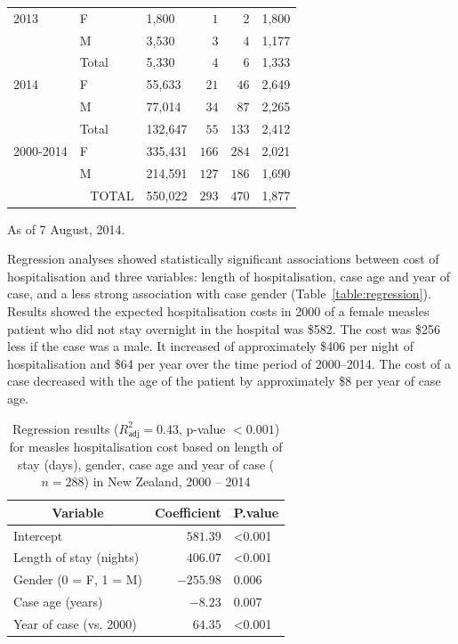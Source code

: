 \documentclass{article}
\begin{document}
\begin{table}
\begin{center}
\begin{tabular}{lllrrl}
2013&F&1,800&$  1$&$  2$&1,800\tabularnewline
&M&3,530&$  3$&$  4$&1,177\tabularnewline
                    &Total&5,330&$  4$&$  6$&1,333\tabularnewline
2014&F&55,633&$ 21$&$ 46$&2,649\tabularnewline
&M&77,014&$ 34$&$ 87$&2,265\tabularnewline
&Total&132,647&$ 55$&$133$&2,412\tabularnewline
2000-2014&      F&335,431&$166$&$284$&2,021\tabularnewline
&     M&214,591&$127$&$186$&1,690\tabularnewline
&   TOTAL&550,022&$293$&$470$&1,877\tabularnewline
\hline
\end{tabular}\end{center}\label{table:cases}
 \centering
 \begin{tablenotes}
      \small
      \item As of 7 August, 2014.
    \end{tablenotes}
\end{table}

Regression analyses showed statistically significant associations between cost of hospitalisation and three variables: length of hospitalisation, case age and year of case, and a less strong association with case gender (Table~\autoref{table:regression}). Results showed the expected hospitalisation costs in 2000 of a female measles patient who did not stay overnight in the hospital was \$582.  The cost was \$256 less if the case was a male. It increased of approximately \$406 per night of hospitalisation and \$64 per year over the time period of 2000--2014. The cost of a case decreased with the age of the patient by approximately \$8 per year of case age.


\begin{table}
\caption{Regression results ($R^{2}_\textsf{adj} = 0.43$, p-value $<0.001$) for measles hospitalisation cost based on length of stay (days), gender, case age and year of case ($n=288$) in New Zealand, 2000 -- 2014}
\begin{center}
\begin{tabular}{lrl}
\hline\hline
\multicolumn{1}{c}{Variable}&\multicolumn{1}{c}{Coefficient}&\multicolumn{1}{c}{P.value}\tabularnewline
\hline
Intercept&$ 581.39$&\textless 0.001\tabularnewline
Length of stay (nights)&$ 406.07$&\textless 0.001\tabularnewline
Gender (0 = F, 1 = M)&$-255.98$&0.006\tabularnewline
Case age (years)&$  -8.23$&0.007\tabularnewline
Year of case (vs. 2000)&$  64.35$&\textless 0.001\tabularnewline
\hline
\end{tabular}\end{center}\label{table:regression}
\end{table}
\end{document}
